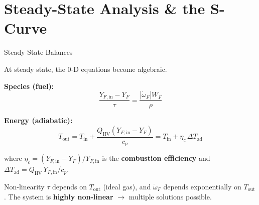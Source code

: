 \documentclass[12pt,aspectratio=169]{beamer}
\newcommand{\taures}{\tau}
\newcommand{\Tin}{T_{\text{in}}}
\newcommand{\Tout}{T_{\text{out}}}
\begin{document}
\section{Steady-State Analysis \& the S-Curve}

\begin{frame}{Steady-State Balances}

  At steady state, the 0-D equations become algebraic.

  \textbf{Species (fuel):}
  \[
    \frac{Y_{F,\text{in}} - Y_F}{\taures} = \frac{|\dot{\omega}_F| W_F}{\rho}
  \]

  \textbf{Energy (adiabatic):}
  \[
    \Tout = \Tin + \frac{Q_{\text{HV}}(Y_{F,\text{in}}-Y_F)}{c_p}
          = \Tin + \eta_c\,\Delta T_{\text{ad}}
  \]

  where $\eta_c = (Y_{F,\text{in}}-Y_F)/Y_{F,\text{in}}$ is the
  \textbf{combustion efficiency} and
  $\Delta T_{\text{ad}} = Q_{\text{HV}}\,Y_{F,\text{in}}/c_p$.

  \begin{alertblock}{Non-linearity}
    $\taures$ depends on $\Tout$ (ideal gas), and $\dot{\omega}_F$ depends
    exponentially on $\Tout$.  The system is \textbf{highly non-linear}
    $\to$ multiple solutions possible.
  \end{alertblock}
\end{frame}
\end{document}
